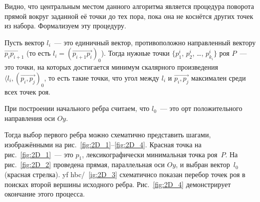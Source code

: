 \documentclass[14pt]{extarticle}
\begin{document}
\medskip

Видно, что центральным местом данного алгоритма является процедура поворота прямой вокруг заданной её точки до тех пора, пока она не коснётся других точек из набора. Формализуем эту процедуру.

Пусть вектор $l_i$~--- это единичный вектор, противоположно направленный вектору $\overrightarrow{p_ip_{i+1}}$ (то есть $l_i = (\overrightarrow{p_{i+1}p_i})_0$). Тогда нужные точки $\{p^i_1$, $p^i_2$, \ldots, $p^i_{k_i}\}$ роя $P$~--- это точки, на которых достигается минимум скалярного произведения $\langle l_i, (\overrightarrow{p_i, p_j})_0$, то есть такие точки, что угол между $l_i$ и $\overrightarrow{p_i, p_j}$ максимален среди всех точек роя.

При построении начального ребра считаем, что $l_0$~--- это орт положительного направления оси $Oy$.

\medskip

Тогда выбор первого ребра можно схематично представить шагами, изображёнными на рис.~\ref{fig:2D_1}--\ref{fig:2D_4}. Красная точка на рис.~\ref{fig:2D_1}~--- это $p_1$, лексикографически минимальная точка роя~$P$. На рис.~\ref{fig:2D_2} проведена прямая, параллельная оси $Oy$, и выбран вектор~$l_0$ (красная стрелка). yf hbc/~\ref{ig:2D_3} схематичнсо показан перебор точек роя в поисках второй вершины исходного ребра. Рис.~\ref{fig:2D_4} демонстрирует окончание этого процесса.
\end{document}
